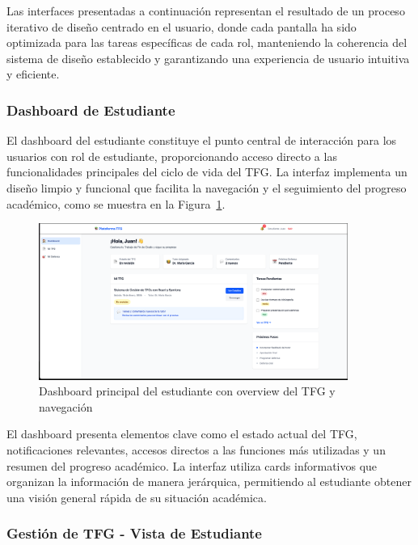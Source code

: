 \documentclass[12pt,a4paper,oneside]{report}
\begin{document}
Las interfaces presentadas a continuación representan el resultado de un proceso iterativo de diseño centrado en el usuario, donde cada pantalla ha sido optimizada para las tareas específicas de cada rol, manteniendo la coherencia del sistema de diseño establecido y garantizando una experiencia de usuario intuitiva y eficiente.

\subsubsection{Dashboard de Estudiante}\label{dashboard-de-estudiante}

El dashboard del estudiante constituye el punto central de interacción para los usuarios con rol de estudiante, proporcionando acceso directo a las funcionalidades principales del ciclo de vida del TFG. La interfaz implementa un diseño limpio y funcional que facilita la navegación y el seguimiento del progreso académico, como se muestra en la Figura~\ref{fig:dashboard-estudiante}.

\begin{figure}[H]
\centering
\includegraphics[width=0.9\textwidth]{processed/images/dashboard_estudiante.png}
\caption{Dashboard principal del estudiante con overview del TFG y navegación}
\label{fig:dashboard-estudiante}
\end{figure}

El dashboard presenta elementos clave como el estado actual del TFG, notificaciones relevantes, accesos directos a las funciones más utilizadas y un resumen del progreso académico. La interfaz utiliza cards informativos que organizan la información de manera jerárquica, permitiendo al estudiante obtener una visión general rápida de su situación académica.

\subsubsection{Gestión de TFG - Vista de Estudiante}\label{gestion-de-tfg---vista-de-estudiante}
\end{document}
